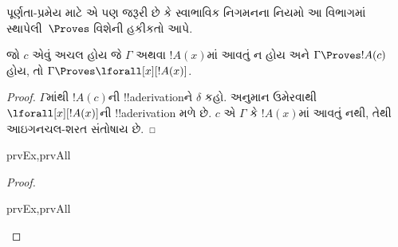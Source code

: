 \documentclass[../../../include/open-logic-section]{subfiles}
\begin{document}


\begin{explain}
  પૂર્ણતા-પ્રમેય માટે એ પણ જરૂરી છે કે સ્વાભાવિક નિગમનના નિયમો આ
  વિભાગમાં સ્થાપેલી~$\Proves$ વિશેની હકીકતો આપે.
\end{explain}

\begin{thm}
 જો $c$ એવું અચલ હોય જે $\Gamma$ અથવા
$!A(x)$માં આવતું ન હોય અને $\Gamma \Proves !A(c)$ હોય, તો
$\Gamma \Proves \lforall[x][!A(x)]$.
\end{thm}

\begin{proof}
$\Gamma$માંથી $!A(c)$ની !!a{derivation}ને $\delta$ કહો.
\Intro{\lforall} અનુમાન ઉમેરવાથી $\lforall[x][!A(x)]$ની
!!a{derivation} મળે છે. $c$ એ $\Gamma$ કે $!A(x)$માં આવતું નથી, તેથી
આઇગનચલ-શરત સંતોષાય છે.
\end{proof}

\begin{prop}
\begin{tagenumerate}{prvEx,prvAll}

\end{tagenumerate}
\end{prop}

\begin{proof}
\begin{tagenumerate}{prvEx,prvAll}

\end{tagenumerate}
\end{proof}
\end{document}
